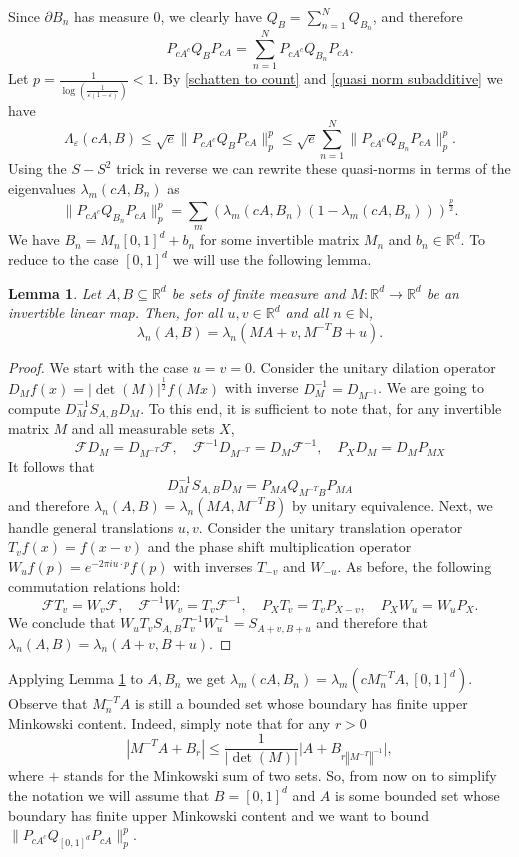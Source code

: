 \documentclass[12pt]{amsart}
\numberwithin{equation}{section}
\newcommand{\N}{\mathbb{N}}
\newcommand{\R}{\mathbb{R}}
\newcommand{\eps}{\varepsilon}
\newcommand{\norm}[1]{\left\Vert #1 \right\Vert}
\newtheorem{lemma}[Thm]{Lemma}
\begin{document}
Since $\partial B_n$ has measure $0$, we clearly have $Q_B = \sum_{n=1}^N Q_{B_n}$, and therefore
$$P_{cA^c}Q_BP_{cA} = \sum_{n=1}^N P_{cA^c}Q_{B_n}P_{c A}.$$
Let $p = \frac{1}{\log \left(\frac{1}{\eps(1-\eps)}\right)} < 1$. By \eqref{schatten to count} and \eqref{quasi norm subadditive} we have
\begin{equation}\label{final bound Lambda}
\Lambda_\eps(cA, B)\le\sqrt{e}\|P_{cA^c}Q_BP_{cA}\|_p^p \le \sqrt{e}\sum_{n=1}^N \|P_{cA^c}Q_{B_n}P_{c A}\|^p_p.
\end{equation}
Using the $S-S^2$ trick in reverse we can rewrite these quasi-norms in terms of the eigenvalues $\lambda_m(cA, B_n)$ as 
$$\|P_{cA^c}Q_{B_n}P_{c A}\|^p_p = \sum_m (\lambda_m(cA, B_n)(1-\lambda_m(cA, B_n)))^{\frac{p}{2}}.$$
We have $B_n = M_n [0,1]^d + b_n$ for some invertible matrix $M_n$ and $b_n\in \R^d$. To reduce to the case $[0,1]^d$ we will use the following lemma.

\begin{lemma}\label{change of variables}
Let $A, B\subseteq \R^d$ be sets of finite measure and $M:\R^d \to \R^d$ be an invertible linear map. Then, for all $u,v\in \R^d$ and all $n\in \N$, 
\[
\lambda_n(A,B) = \lambda_n(MA + v, M^{-T}B +u).
\]
\end{lemma}
\begin{proof}
We start with the case $u = v = 0$. Consider the unitary dilation operator $D_Mf(x) = |\operatorname{det}(M)|^{\frac{1}{2}} f(Mx)$ with inverse $D_{M}^{-1} = D_{M^{-1}}$. We are going to compute $D_{M}^{-1} S_{A,B} D_{M}$. To this end, it is sufficient to note that, for any invertible matrix $M$ and all measurable sets $X$,
\[
\mathcal{F} D_{M} =  D_{M^{-T}} \mathcal{F}, \quad \mathcal{F}^{-1}D_{M^{-T}} = D_M \mathcal{F}^{-1}, \quad P_X D_M = D_M P_{MX}
\]
It follows that 
\[
D_{M}^{-1} S_{A,B} D_{M} = P_{MA} Q_{M^{-T}B} P_{MA}
\]
and therefore $\lambda_n(A,B) = \lambda_n(MA, M^{-T} B)$ by unitary equivalence. Next, we handle general translations $u,v$. Consider the unitary translation operator $T_vf(x) = f(x-v)$ and the phase shift multiplication operator $W_uf(p) = e^{-2\pi i u\cdot p} f(p)$ with inverses $T_{-v}$ and $W_{-u}$. As before, the following commutation relations hold:
\[
\mathcal{F}T_v = W_v \mathcal{F}, \quad \mathcal{F}^{-1} W_v = T_v \mathcal{F}^{-1}, \quad P_X T_v = T_v P_{X-v}, \quad P_X W_u = W_u P_X.
\]
We conclude that $W_u^{} T_v^{} S_{A,B} T_v^{-1} W_u^{-1} = S_{A+v, B+u}$ and therefore that $\lambda_n(A,B) = \lambda_n(A+v, B+u)$.

\end{proof}
Applying Lemma \ref{change of variables} to $A, B_n$ we get $\lambda_m(cA,B_n) = \lambda_m(cM_n^{-T}A, [0,1]^d)$. Observe that $M_n^{-T}A$ is still a bounded set whose boundary has finite upper Minkowski content. Indeed, simply note that for any $r>0$
\[
|M^{-T} A + B_r| \leq \frac{1}{|\operatorname{det}(M)|} \big\lvert A + B_{r\norm{M^{-T}}^{-1}} \big\rvert,
\]
where $+$ stands for the Minkowski sum of two sets. So, from now on to simplify the notation we will assume that $B = [0,1]^d$ and $A$ is some bounded set whose boundary has finite upper Minkowski content and we want to bound $\|P_{cA^c}Q_{[0,1]^d}P_{c A}\|^p_p$.
\end{document}

